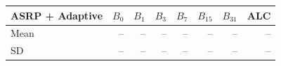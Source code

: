 \begin{tabular}{lrrrrrrr}
\toprule
ASRP + Adaptive & $B_0$ & $B_1$ & $B_3$ & $B_7$ & $B_{15}$ & $B_{31}$ & ALC\\
\midrule
Mean & -- & -- & -- & -- & -- & -- & --\\
SD & -- & -- & -- & -- & -- & -- & --\\
\bottomrule
\end{tabular}
